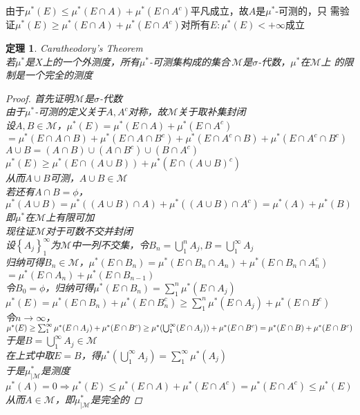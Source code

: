 \documentclass[12pt, a4paper, oneside]{ctexbook}
\newtheorem{theorem}{定理}[section]
\begin{document}
由于$\mu^*(E)\leq\mu^*(E\cap A)+\mu^*(E\cap A^c)$平凡成立，故$A$是$\mu^*$-可测的，只
需验证$\mu^*(E)\geq\mu^*(E\cap A)+\mu^*(E\cap A^c)$对所有$E:\mu^*(E)<+\infty$成立
\begin{theorem}
    Caratheodory's Theorem\\
    若$\mu^*$是$X$上的一个外测度，所有$\mu^*$-可测集构成的集合$\,\mathcal{M}$是$\sigma$-代数，$\mu^*$在$\mathcal{M}$上
    的限制是一个完全的测度
    \begin{proof}
        首先证明$\mathcal{M}$是$\sigma$-代数\\
        由于$\mu^*$-可测的定义关于$A,A^c$对称，故$\mathcal{M}$关于取补集封闭\\
        设$A,B\in\mathcal{M}$，$\mu^*(E)=\mu^*(E\cap A)+\mu^*(E\cap A^c)$\\
        $=\mu^*(E\cap A\cap B)+\mu^*(E\cap A\cap B^c)+\mu^*(E\cap A^c\cap B)+\mu^*(E\cap A^c\cap B^c)$\\
        $A\cup B=(A\cap B)\cup(A\cap B^c)\cup(B\cap A^c)$\\
        $\mu^*(E)\geq\mu^*(E\cap(A\cup B))+\mu^*(E\cap(A\cup B)^c)$\\
        从而$A\cup B$可测，$A\cup B\in\mathcal{M}$\\
        若还有$A\cap B=\phi$，\\
        $\mu^*(A\cup B)=\mu^*((A\cup B)\cap A)+\mu^*((A\cup B)\cap A^c)=\mu^*(A)+\mu^*(B)$\\
        即$\mu^*$在$\mathcal{M}$上有限可加\\
        现往证$\mathcal{M}$对于可数不交并封闭\\
        设$\left\{A_j\right\}_1^{\infty}$为$\mathcal{M}$中一列不交集，令$B_n=\bigcup_1^nA_j,B=\bigcup_1^{\infty}A_j$\\
        归纳可得$B_n\in\mathcal{M}$，$\mu^*(E\cap B_n)=\mu^*(E\cap B_n\cap A_n)+\mu^*(E\cap B_n\cap A_n^c)$\\
        $=\mu^*(E\cap A_n)+\mu^*(E\cap B_{n-1})$\\
        令$B_0=\phi$，归纳可得$\mu^*(E\cap B_n)=\sum_1^n\mu^*(E\cap A_j)$\\
        $\mu^*(E)=\mu^*(E\cap B_n)+\mu^*(E\cap B_n^c)\geq\sum_1^n\mu^*(E\cap A_j)+\mu^*(E\cap B^c)$\\
        令$n\rightarrow\infty$，$\mu^*(E)\geq\sum_1^{\infty}\mu^*(E\cap A_j)+\mu^*(E\cap B^c)\\
        \geq\mu^*(\bigcup_1^{\infty}(E\cap A_j))+\mu^*(E\cap B^c)=\mu^*(E\cap B)+\mu^*(E\cap B^c)$\\
        于是$B=\bigcup_1^{\infty}A_j\in\mathcal{M}$\\
        在上式中取$E=B$，得$\mu^*(\bigcup_1^{\infty}A_j)=\sum_1^{\infty}\mu^*(A_j)$\\
        于是$\mu^*_{|\mathcal{M}}$是测度\\
        $\mu^*(A)=0\Rightarrow\mu^*(E)\leq\mu^*(E\cap A)+\mu^*(E\cap A^c)=\mu^*(E\cap A^c)\leq\mu^*(E)$\\
        从而$A\in\mathcal{M}$，即$\mu^*_{|\mathcal{M}}$是完全的
    \end{proof}
\end{theorem}
\end{document}
